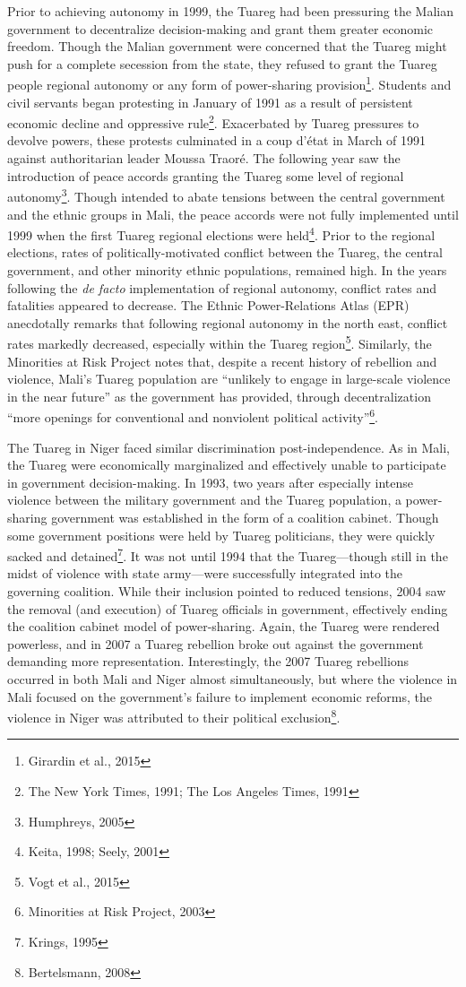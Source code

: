 \documentclass[12pt]{article}
\begin{document}
Prior to achieving autonomy in 1999, the Tuareg had been pressuring the Malian government to decentralize decision-making and grant them greater economic freedom. Though the Malian government were concerned that the Tuareg might push for a complete secession from the state, they refused to grant the Tuareg people regional autonomy or any form of power-sharing provision\footnote{Girardin et al., 2015}. Students and civil servants began protesting in January of 1991 as a result of persistent economic decline and oppressive rule\footnote{The New York Times, 1991; The Los Angeles Times, 1991}. Exacerbated by Tuareg pressures to devolve powers, these protests culminated in a coup d’état in March of 1991 against authoritarian leader Moussa Traoré. The following year saw the introduction of peace accords granting the Tuareg some level of regional autonomy\footnote{Humphreys, 2005}. Though intended to abate tensions between the central government and the ethnic groups in Mali, the peace accords were not fully implemented until 1999 when the first Tuareg regional elections were held\footnote{Keita, 1998; Seely, 2001}. Prior to the regional elections, rates of politically-motivated conflict between the Tuareg, the central government, and other minority ethnic populations, remained high. In the years following the \textit{de facto} implementation of regional autonomy, conflict rates and fatalities appeared to decrease. The Ethnic Power-Relations Atlas (EPR) anecdotally remarks that following regional autonomy in the north east, conflict rates markedly decreased, especially within the Tuareg region\footnote{Vogt et al., 2015}. Similarly, the Minorities at Risk Project notes that, despite a recent history of rebellion and violence, Mali's Tuareg population are ``unlikely to engage in large-scale violence in the near future'' as the government has provided, through decentralization ``more openings for conventional and nonviolent political activity''\footnote{Minorities at Risk Project, 2003}. 

The Tuareg in Niger faced similar discrimination post-independence. As in Mali, the Tuareg were economically marginalized and effectively unable to participate in government decision-making. In 1993, two years after especially intense violence between the military government and the Tuareg population, a power-sharing government was established in the form of a coalition cabinet. Though some government positions were held by Tuareg politicians, they were quickly sacked and detained\footnote{Krings, 1995}. It was not until 1994 that the Tuareg---though still in the midst of violence with state army---were successfully integrated into the governing coalition. While their inclusion pointed to reduced tensions, 2004 saw the removal (and execution) of Tuareg officials in government, effectively ending the coalition cabinet model of power-sharing. Again, the Tuareg were rendered powerless, and in 2007 a Tuareg rebellion broke out against the government demanding more representation. Interestingly, the 2007 Tuareg rebellions occurred in both Mali and Niger almost simultaneously, but where the violence in Mali focused on the government's failure to implement economic reforms, the violence in Niger was attributed to their political exclusion\footnote{Bertelsmann, 2008}. 
\end{document}
